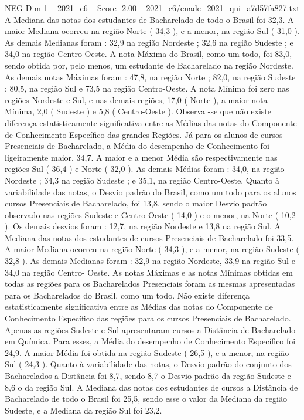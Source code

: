 \begin{textsample}{NEG Dim 1 – 2021\_c6 – Score -2.00 – 2021\_c6/enade\_2021\_qui\_a7d57fa827.txt}
A Mediana das notas dos estudantes de Bacharelado de todo o Brasil foi 32,3.
A maior Mediana ocorreu na região Norte ( 34,3 ), e a menor, na região Sul ( 31,0 ).
As demais Medianas foram : 32,9 na região Nordeste ; 32,6 na região Sudeste ; e 34,0 na região Centro-Oeste.
A nota Máxima do Brasil, como um todo, foi 83,0, sendo obtida por, pelo menos, um estudante de Bacharelado na região Nordeste.
As demais notas Máximas foram : 47,8, na região Norte ; 82,0, na região Sudeste ; 80,5, na região Sul e 73,5 na região Centro-Oeste.
A nota Mínima foi zero nas regiões Nordeste e Sul, e nas demais regiões, 17,0 ( Norte ), a maior nota Mínima, 2,0 ( Sudeste ) e 5,8 ( Centro-Oeste ).
Observa -se que não existe diferença estatisticamente significativa entre as Médias das notas do Componente de Conhecimento Específico das grandes Regiões.
Já para os alunos de cursos Presenciais de Bacharelado, a Média do desempenho de Conhecimento foi ligeiramente maior, 34,7.
A maior e a menor Média são respectivamente nas regiões Sul ( 36,4 ) e Norte ( 32,0 ).
As demais Médias foram : 34,0, na região Nordeste ; 34,3 na região Sudeste ; e 35,1, na região Centro-Oeste.
Quanto à variabilidade das notas, o Desvio padrão do Brasil, como um todo para os alunos cursos Presenciais de Bacharelado, foi 13,8, sendo o maior Desvio padrão observado nas regiões Sudeste e Centro-Oeste ( 14,0 ) e o menor, na Norte ( 10,2 ).
Os demais desvios foram : 12,7, na região Nordeste e 13,8 na região Sul.
A Mediana das notas dos estudantes de cursos Presenciais de Bacharelado foi 33,5.
A maior Mediana ocorreu na região Norte ( 34,3 ), e a menor, na região Sudeste ( 32,8 ).
As demais Medianas foram : 32,9 na região Nordeste, 33,9 na região Sul e 34,0 na região Centro- Oeste.
As notas Máximas e as notas Mínimas obtidas em todas as regiões para os Bacharelados Presenciais foram as mesmas apresentadas para os Bacharelados do Brasil, como um todo.
Não existe diferença estatisticamente significativa entre as Médias das notas do Componente de Conhecimento Específico das regiões para os cursos Presenciais de Bacharelado.
Apenas as regiões Sudeste e Sul apresentaram cursos a Distância de Bacharelado em Química.
Para esses, a Média do desempenho de Conhecimento Específico foi 24,9.
A maior Média foi obtida na região Sudeste ( 26,5 ), e a menor, na região Sul ( 24,3 ).
Quanto à variabilidade das notas, o Desvio padrão do conjunto dos Bacharelados a Distância foi 8,7, sendo 8,7 o Desvio padrão da região Sudeste e 8,6 o da região Sul.
A Mediana das notas dos estudantes de cursos a Distância de Bacharelado de todo o Brasil foi 25,5, sendo esse o valor da Mediana da região Sudeste, e a Mediana da região Sul foi 23,2.

\end{textsample}
